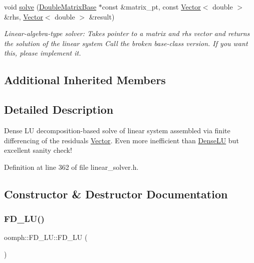 \begin{DoxyCompactItemize}
void \hyperlink{classoomph_1_1FD__LU_a2a44542b29faa39f1b816dc80da9eba1}{solve} (\hyperlink{classoomph_1_1DoubleMatrixBase}{Double\+Matrix\+Base} $\ast$const \&matrix\+\_\+pt, const \hyperlink{classoomph_1_1Vector}{Vector}$<$ double $>$ \&rhs, \hyperlink{classoomph_1_1Vector}{Vector}$<$ double $>$ \&result)
\begin{DoxyCompactList}\small\item\em Linear-\/algebra-\/type solver\+: Takes pointer to a matrix and rhs vector and returns the solution of the linear system Call the broken base-\/class version. If you want this, please implement it. \end{DoxyCompactList}\end{DoxyCompactItemize}
\subsection*{Additional Inherited Members}


\subsection{Detailed Description}
Dense LU decomposition-\/based solve of linear system assembled via finite differencing of the residuals \hyperlink{classoomph_1_1Vector}{Vector}. Even more inefficient than \hyperlink{classoomph_1_1DenseLU}{Dense\+LU} but excellent sanity check! 

Definition at line 362 of file linear\+\_\+solver.\+h.



\subsection{Constructor \& Destructor Documentation}
\mbox{\label{classoomph_1_1FD__LU_a146eb52770fe0c6c2f828bb55c9be862}} 
\subsubsection{\texorpdfstring{F\+D\+\_\+\+L\+U()}{FD\_LU()}\hspace{0.1cm}{\footnotesize\ttfamily [1/2]}}
{\footnotesize\ttfamily oomph\+::\+F\+D\+\_\+\+L\+U\+::\+F\+D\+\_\+\+LU (\begin{DoxyParamCaption}{ }\end{DoxyParamCaption})\hspace{0.3cm}{\ttfamily [inline]}}



